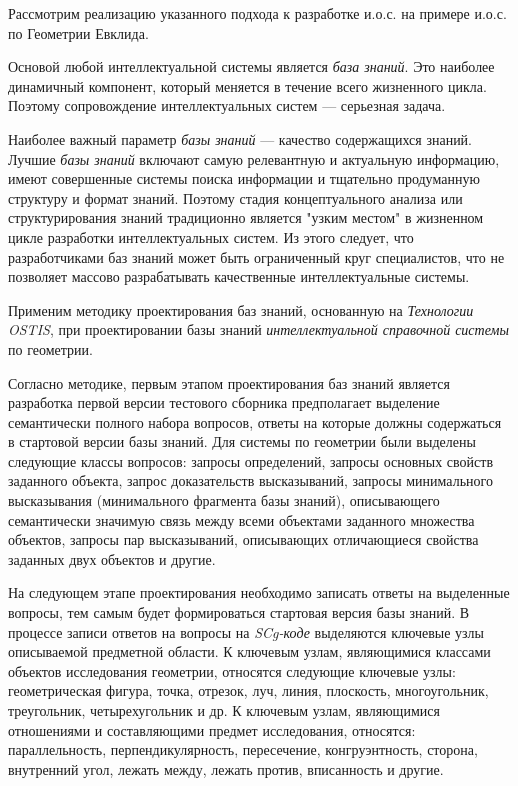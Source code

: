 Рассмотрим реализацию указанного подхода к разработке и.о.с. на примере и.о.с. по Геометрии Евклида.

Основой любой интеллектуальной системы является \textit{база знаний}. Это наиболее динамичный компонент, который меняется в течение всего жизненного цикла. Поэтому сопровождение интеллектуальных систем --- серьезная задача.

Наиболее важный параметр \textit{базы знаний} --- качество содержащихся знаний. Лучшие \textit{базы знаний} включают самую релевантную и актуальную информацию, имеют совершенные системы поиска информации и тщательно продуманную структуру и формат знаний. Поэтому стадия концептуального анализа или структурирования знаний традиционно является "узким местом"{} в жизненном цикле разработки интеллектуальных систем. Из этого следует, что разработчиками баз знаний может быть ограниченный круг специалистов, что не позволяет массово разрабатывать качественные интеллектуальные системы.

Применим методику проектирования баз знаний, основанную на \textit{Технологии OSTIS}, при проектировании базы знаний \textit{интеллектуальной справочной системы} по геометрии.

Согласно методике, первым этапом проектирования баз знаний является разработка первой версии тестового сборника предполагает выделение семантически полного набора вопросов, ответы на которые должны содержаться в стартовой версии базы знаний. Для системы по геометрии были выделены следующие классы вопросов: запросы определений, запросы основных свойств заданного объекта, запрос доказательств высказываний, запросы минимального высказывания (минимального фрагмента базы знаний), описывающего семантически значимую связь между всеми объектами заданного множества объектов, запросы пар высказываний, описывающих отличающиеся свойства заданных двух объектов и другие.

На следующем этапе проектирования необходимо записать ответы на выделенные вопросы, тем самым будет формироваться стартовая версия базы знаний. В процессе записи ответов на вопросы на \textit{SCg-коде} выделяются ключевые узлы описываемой предметной области. К ключевым узлам, являющимися классами объектов исследования геометрии, относятся следующие ключевые узлы: геометрическая фигура, точка, отрезок, луч, линия, плоскость, многоугольник, треугольник, четырехугольник и др. К ключевым узлам, являющимися отношениями и составляющими предмет исследования, относятся: параллельность, перпендикулярность, пересечение, конгруэнтность, сторона, внутренний угол, лежать между, лежать против, вписанность и другие.

